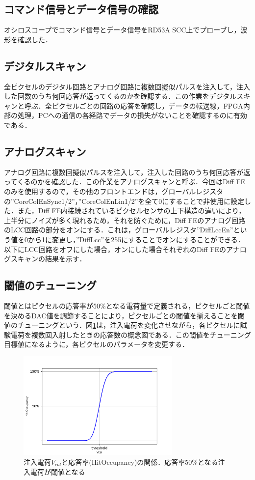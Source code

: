 \subsection{コマンド信号とデータ信号の確認}
オシロスコープでコマンド信号とデータ信号をRD53A SCC上でプローブし，波形を確認した．

\subsection{デジタルスキャン}
全ピクセルのデジタル回路とアナログ回路に複数回擬似パルスを注入して，注入した回数のうち何回応答が返ってくるのかを確認する．この作業をデジタルスキャンと呼ぶ．全ピクセルごとの回路の応答を確認し，データの転送線，FPGA内部の処理，PCへの通信の各経路でデータの損失がないことを確認するのに有効である．

\subsection{アナログスキャン}
アナログ回路に複数回擬似パルスを注入して，注入した回路のうち何回応答が返ってくるのかを確認した．この作業をアナログスキャンと呼ぶ．今回はDiff FEのみを使用するので，その他のフロントエンドは，グローバルレジスタの''CoreColEnSync1/2''，''CoreColEnLin1/2''を全て0にすることで非使用に設定した．また，Diff FE内接続されているピクセルセンサの上下構造の違いにより，上半分にノイズが多く現れるため，それを防ぐために，Diff FEのアナログ回路のLCC回路の部分をオンにする．これは，グローバルレジスタ''DiffLccEn''という値を0から1に変更し，''DiffLcc''を255にすることでオンにすることができる．以下にLCC回路をオフにした場合，オンにした場合それぞれのDiff FEのアナログスキャンの結果を示す．

\subsection{閾値のチューニング}
閾値とはピクセルの応答率が50$\mathrm{\%}$となる電荷量で定義される，ピクセルごと閾値を決めるDAC値を調節することにより，ピクセルごとの閾値を揃えることを閾値のチューニングという．図\ref{fig:scurve}は，注入電荷を変化させながら，各ピクセルに試験電荷を複数回入射したときの応答数の概念図である．この閾値をチューニング目標値になるように，各ピクセルのパラメータを変更する．
\begin{figure}[h]
\centering
\includegraphics[width=8cm]{./figure/scurve.png}
\caption{注入電荷$V_{cal}$と応答率(HitOccupancy)の関係．応答率50$\mathrm{\%}$となる注入電荷が閾値となる}
\label{fig:scurve}
\end{figure}


